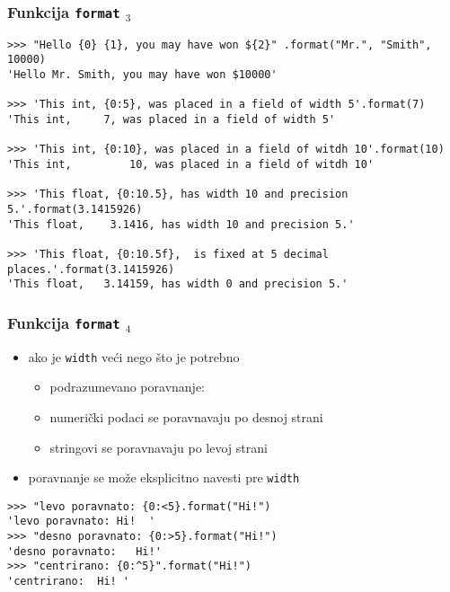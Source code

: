 \documentclass[utf8,compress]{beamer}
\begin{document}
\begin{frame}[fragile,shrink=25]
  \frametitle{Funkcija \texttt{format} $_3$}
\begin{verbatim}
>>> "Hello {0} {1}, you may have won ${2}" .format("Mr.", "Smith", 10000)
'Hello Mr. Smith, you may have won $10000'

>>> 'This int, {0:5}, was placed in a field of width 5'.format(7)
'This int,     7, was placed in a field of width 5'

>>> 'This int, {0:10}, was placed in a field of witdh 10'.format(10)
'This int,         10, was placed in a field of witdh 10'

>>> 'This float, {0:10.5}, has width 10 and precision 5.'.format(3.1415926)
'This float,    3.1416, has width 10 and precision 5.'

>>> 'This float, {0:10.5f},  is fixed at 5 decimal places.'.format(3.1415926)
'This float,   3.14159, has width 0 and precision 5.'
\end{verbatim}
\end{frame}

\begin{frame}[fragile]
  \frametitle{Funkcija \texttt{format} $_4$}
  \begin{itemize}
    \item ako je \texttt{width} veći nego što je potrebno
    \begin{itemize}
      \item podrazumevano poravnanje:
      \item numerički podaci se poravnavaju po desnoj strani
      \item stringovi se poravnavaju po levoj strani
    \end{itemize}
    \item poravnanje se može eksplicitno navesti pre \texttt{width}
  \end{itemize}
\begin{verbatim}
>>> "levo poravnato: {0:<5}.format("Hi!")
'levo poravnato: Hi!  '
>>> "desno poravnato: {0:>5}.format("Hi!")
'desno poravnato:   Hi!'
>>> "centrirano: {0:^5}".format("Hi!")
'centrirano:  Hi! '
\end{verbatim}
\end{frame}
\end{document}
